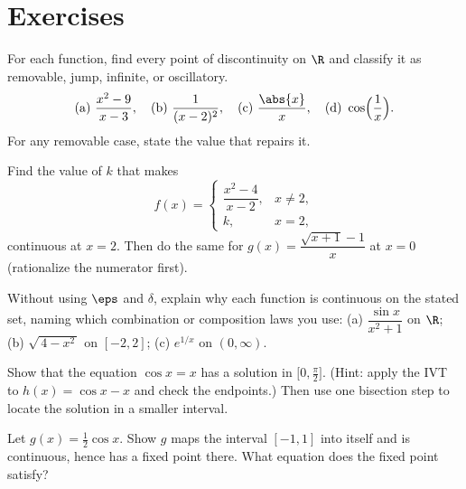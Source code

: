 \section{Exercises}
\label{ch08:exercises}

\begin{exercise}
\label{ch08:exr-classify}
For each function, find every point of discontinuity on $\R$ and classify it as removable,
jump, infinite, or oscillatory.
\[
  \text{(a) } \frac{x^2-9}{x-3}, \quad
  \text{(b) } \frac{1}{(x-2)^2}, \quad
  \text{(c) } \frac{\abs{x}}{x}, \quad
  \text{(d) } \cos\!\Big(\frac{1}{x}\Big).
\]
For any removable case, state the value that repairs it.
\end{exercise}

\begin{exercise}
\label{ch08:exr-piecewise}
Find the value of $k$ that makes
\[
  f(x)=\begin{cases} \dfrac{x^2-4}{x-2}, & x\ne 2,\\[1.4ex] k, & x=2,\end{cases}
\]
continuous at $x=2$. Then do the same for
$\displaystyle g(x)=\dfrac{\sqrt{x+1}-1}{x}$ at $x=0$ (rationalize the numerator first).
\end{exercise}

\begin{exercise}
\label{ch08:exr-inheritance}
Without using $\eps$ and $\delta$, explain why each function is continuous on the stated
set, naming which combination or composition laws you use:
(a) $\dfrac{\sin x}{x^2+1}$ on $\R$; \quad
(b) $\sqrt{\,4-x^2\,}$ on $[-2,2]$; \quad
(c) $e^{1/x}$ on $(0,\infty)$.
\end{exercise}

\begin{exercise}
\label{ch08:exr-root}
Show that the equation $\cos x = x$ has a solution in $\big[0,\tfrac{\pi}{2}\big]$. (Hint:
apply the IVT to $h(x)=\cos x - x$ and check the endpoints.) Then use one bisection step to
locate the solution in a smaller interval.
\end{exercise}

\begin{exercise}
\label{ch08:exr-fixed}
Let $g(x)=\tfrac12\cos x$. Show $g$ maps the interval $[-1,1]$ into itself and is
continuous, hence has a fixed point there. What equation does the fixed point satisfy?
\end{exercise}

